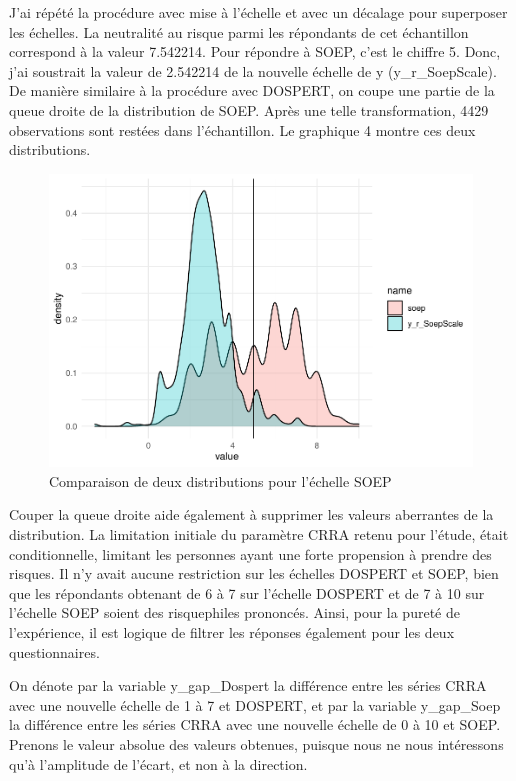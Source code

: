 \documentclass[12pt]{article}
\begin{document}
J'ai répété la procédure avec mise à l'échelle et avec un décalage pour
superposer les échelles. La neutralité au risque parmi les répondants de
cet échantillon correspond à la valeur 7.542214. Pour répondre à SOEP,
c'est le chiffre 5. Donc, j'ai soustrait la valeur de 2.542214 de la
nouvelle échelle de y (y\_r\_SoepScale). De manière similaire à la
procédure avec DOSPERT, on coupe une partie de la queue droite de la
distribution de SOEP. Après une telle transformation, 4429 observations
sont restées dans l'échantillon. Le graphique 4 montre ces deux
distributions.

\begin{figure}
\centering
\includegraphics{Report-de-stage_files/figure-latex/distsoep-1}
\caption{Comparaison de deux distributions pour l'échelle SOEP}
\end{figure}

Couper la queue droite aide également à supprimer les valeurs aberrantes
de la distribution. La limitation initiale du paramètre CRRA retenu pour
l'étude, était conditionnelle, limitant les personnes ayant une forte
propension à prendre des risques. Il n'y avait aucune restriction sur
les échelles DOSPERT et SOEP, bien que les répondants obtenant de 6 à 7
sur l'échelle DOSPERT et de 7 à 10 sur l'échelle SOEP soient des
risquephiles prononcés. Ainsi, pour la pureté de l'expérience, il est
logique de filtrer les réponses également pour les deux questionnaires.

On dénote par la variable y\_gap\_Dospert la différence entre les séries
CRRA avec une nouvelle échelle de 1 à 7 et DOSPERT, et par la variable
y\_gap\_Soep la différence entre les séries CRRA avec une nouvelle
échelle de 0 à 10 et SOEP. Prenons le valeur absolue des valeurs
obtenues, puisque nous ne nous intéressons qu'à l'amplitude de l'écart,
et non à la direction.
\end{document}

